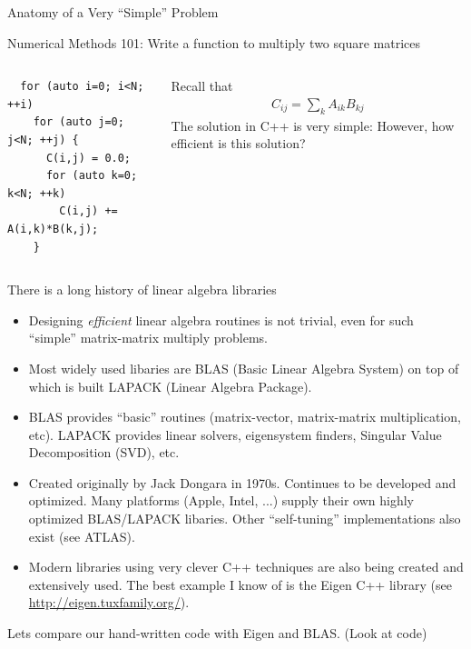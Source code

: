 \documentclass[aspectratio=169]{beamer}
\newcommand{\mypause}{\pause}
\newcommand{\myb}[1]{{\color{blue} {#1}}}
\begin{document}
\begin{frame}[fragile]{Anatomy of a Very ``Simple'' Problem}

  \myb{Numerical Methods 101: Write a function to multiply two square
    matrices}%
  \vskip0.1in%
  \begin{columns}
    \begin{column}{0.4\linewidth}
\begin{verbatim}
  for (auto i=0; i<N; ++i)
    for (auto j=0; j<N; ++j) {
      C(i,j) = 0.0;
      for (auto k=0; k<N; ++k)
        C(i,j) += A(i,k)*B(k,j);
    }
\end{verbatim}
  \end{column}
  
  \begin{column}{0.5\linewidth}
    Recall that
    \begin{align*}
      C_{ij} = \sum_k A_{ik} B_{kj}
    \end{align*}
    \mypause%
    \vskip0.1in%
    The solution in C++ is very simple: However, how efficient is this
    solution?
  \end{column}
\end{columns}  

\end{frame}

\begin{frame}{There is a long history of linear algebra libraries}
  \footnotesize%
  \begin{itemize}
  \item Designing \emph{efficient} linear algebra routines is not
    trivial, even for such ``simple'' matrix-matrix multiply problems.
  \item Most widely used libaries are BLAS (Basic Linear Algebra
    System) on top of which is built LAPACK (Linear Algebra Package).
  \item BLAS provides ``basic'' routines (matrix-vector, matrix-matrix
    multiplication, etc). LAPACK provides linear solvers, eigensystem
    finders, Singular Value Decomposition (SVD), etc.
  \item Created originally by Jack Dongara in 1970s. Continues to be
    developed and optimized. Many platforms (Apple, Intel, ...) supply
    their own highly optimized BLAS/LAPACK libaries. Other
    ``self-tuning'' implementations also exist (see ATLAS).
  \item Modern libraries using very clever C++ techniques are also
    being created and extensively used. The best example I know of is
    the Eigen C++ library (see \url{http://eigen.tuxfamily.org/}).
  \end{itemize}
  \normalsize%
  \myb{Lets compare our hand-written code with Eigen and BLAS. (Look
    at code)}

\end{frame}
\end{document}
